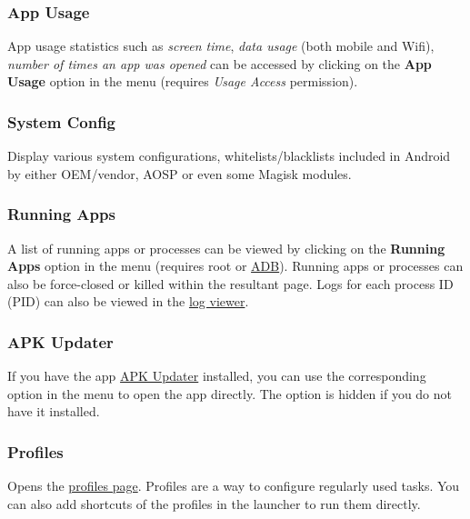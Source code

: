 \subsubsection{App Usage} %
App usage statistics such as \textit{screen time}, \textit{data usage} (both mobile and Wifi), \textit{number of times
an app was opened} can be accessed by clicking on the \textbf{App Usage} option in the menu (requires \textit{Usage
Access} permission).

\subsubsection{System Config} %
Display various system configurations, whitelists/blacklists included in Android by either OEM/vendor, AOSP or even some
Magisk modules.

\subsubsection{Running Apps}\label{subsubsec:main:running-apps} %
A list of running apps or processes can be viewed by clicking on the \textbf{Running Apps} option in the menu (requires
root or \hyperref[sec:adb-over-tcp]{ADB}).
Running apps or processes can also be force-closed or killed within the resultant page.
Logs for each process ID (PID) can also be viewed in the \hyperref[subsubsec:log-viewer]{log viewer}.

\subsubsection{APK Updater} %
If you have the app \href{https://github.com/rumboalla/apkupdater}{APK Updater} installed, you can use the corresponding
option in the menu to open the app directly.
The option is hidden if you do not have it installed.

\subsubsection{Profiles} %
Opens the \hyperref[sec:profiles-page]{profiles page}.
Profiles are a way to configure regularly used tasks.
You can also add shortcuts of the profiles in the launcher to run them directly.

